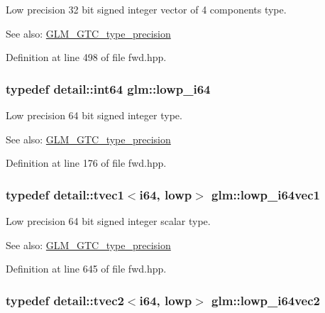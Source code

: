 Low precision 32 bit signed integer vector of 4 components type. \begin{Desc}
\item[See also:]\hyperlink{group__gtc__type__precision}{GLM\_\-GTC\_\-type\_\-precision} \end{Desc}


Definition at line 498 of file fwd.hpp.\hypertarget{group__gtc__type__precision_g1f4ded25f71c0f3b4518936d50b54b6e}{
\subsubsection[lowp\_\-i64]{\setlength{\rightskip}{0pt plus 5cm}typedef detail::int64 {\bf glm::lowp\_\-i64}}}
\label{group__gtc__type__precision_g1f4ded25f71c0f3b4518936d50b54b6e}


Low precision 64 bit signed integer type. \begin{Desc}
\item[See also:]\hyperlink{group__gtc__type__precision}{GLM\_\-GTC\_\-type\_\-precision} \end{Desc}


Definition at line 176 of file fwd.hpp.\hypertarget{group__gtc__type__precision_gf427ced1906a1788fdd9faab2e57c60a}{
\subsubsection[lowp\_\-i64vec1]{\setlength{\rightskip}{0pt plus 5cm}typedef detail::tvec1$<$i64, lowp$>$ {\bf glm::lowp\_\-i64vec1}}}
\label{group__gtc__type__precision_gf427ced1906a1788fdd9faab2e57c60a}


Low precision 64 bit signed integer scalar type. \begin{Desc}
\item[See also:]\hyperlink{group__gtc__type__precision}{GLM\_\-GTC\_\-type\_\-precision} \end{Desc}


Definition at line 645 of file fwd.hpp.\hypertarget{group__gtc__type__precision_gd88a04aaa07fabf57fdbad8e6b7bcc9c}{
\subsubsection[lowp\_\-i64vec2]{\setlength{\rightskip}{0pt plus 5cm}typedef detail::tvec2$<$i64, lowp$>$ {\bf glm::lowp\_\-i64vec2}}}
\label{group__gtc__type__precision_gd88a04aaa07fabf57fdbad8e6b7bcc9c}


